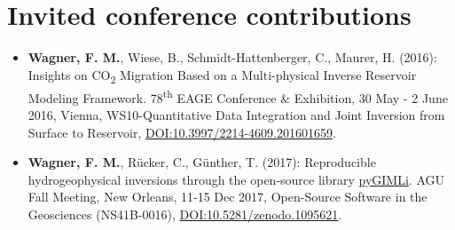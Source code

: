 \documentclass[11pt,a4paper,serif,linkcolor=true]{moderncv} %
\begin{document}
\section{Invited conference contributions}
\footnotesize
\begin{itemize}[label={},itemindent=-1.8em,leftmargin=1.8em]
\item \textbf{Wagner, F. M.}, Wiese, B., Schmidt-Hattenberger, C., Maurer, H.
(2016): Insights on CO\textsubscript{2} Migration Based on a
Multi-physical Inverse Reservoir Modeling Framework.
78\textsuperscript{th} EAGE Conference \& Exhibition, 30 May - 2 June
2016, Vienna, WS10-Quantitative Data Integration and Joint Inversion
from Surface to Reservoir,
\href{https://doi.org/10.3997/2214-4609.201601659}{\url{DOI:10.3997/2214-4609.201601659}}.
\item \textbf{Wagner, F. M.}, Rücker, C., Günther, T. (2017): Reproducible
hydrogeophysical inversions through the open-source library
\href{http://www.pygimli.org/}{pyGIMLi}. AGU Fall Meeting, New Orleans,
11-15 Dec 2017, Open-Source Software in the Geosciences (NS41B-0016),
\href{https://doi.org/10.5281/zenodo.1095621}{\url{DOI:10.5281/zenodo.1095621}}.
\end{itemize}



\end{document}
